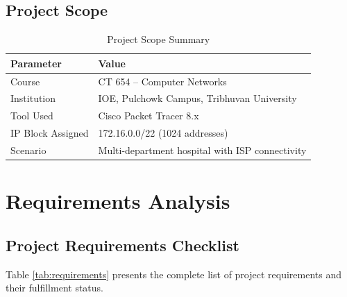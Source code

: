 \documentclass[12pt,a4paper]{report}
\begin{document}
\section{Project Scope}
\begin{table}[H]
\centering
\caption{Project Scope Summary}
\begin{tabular}{ll}
\toprule
\textbf{Parameter} & \textbf{Value} \\
\midrule
Course & CT 654 -- Computer Networks \\
Institution & IOE, Pulchowk Campus, Tribhuvan University \\
Tool Used & Cisco Packet Tracer 8.x \\
IP Block Assigned & 172.16.0.0/22 (1024 addresses) \\
Scenario & Multi-department hospital with ISP connectivity \\
\bottomrule
\end{tabular}
\end{table}

\chapter{Requirements Analysis}

\section{Project Requirements Checklist}
Table \ref{tab:requirements} presents the complete list of project requirements and their fulfillment status.
\end{document}
